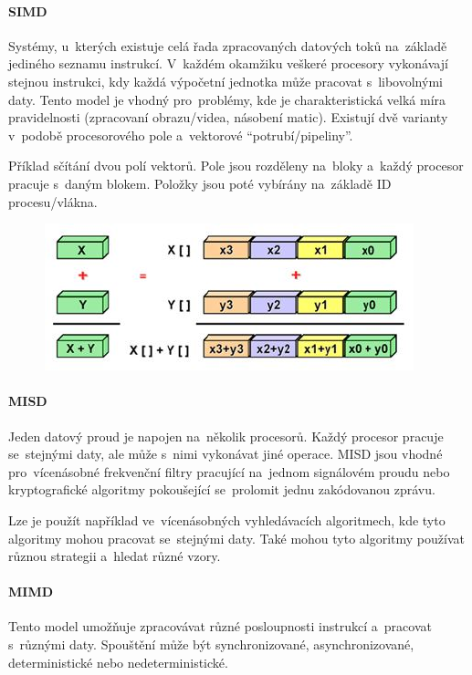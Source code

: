 \paragraph{SIMD}

Systémy, u~kterých existuje celá řada zpracovaných datových toků na~základě jediného seznamu instrukcí. V~každém okamžiku veškeré procesory vykonávají stejnou instrukci, kdy každá výpočetní jednotka může pracovat s~libovolnými daty. Tento model je vhodný pro~problémy, kde je charakteristická velká míra pravidelnosti (zpracovaní obrazu/videa, násobení matic). Existují dvě varianty v~podobě procesorového pole a~vektorové \enquote{potrubí/pipeliny}.

Příklad sčítání dvou polí vektorů. Pole jsou rozděleny na~bloky a~každý procesor pracuje s~daným blokem. Položky jsou poté vybírány na~základě ID procesu/vlákna.

\begin{figure}[ht]
	\centering
	\includegraphics[scale=0.7]{images/SIMD.JPG}
\end{figure}

\paragraph{MISD}

Jeden datový proud je napojen na~několik procesorů. Každý procesor pracuje se~stejnými daty, ale může s~nimi vykonávat jiné operace. MISD jsou vhodné pro~vícenásobné frekvenční filtry pracující na~jednom signálovém proudu nebo kryptografické algoritmy pokoušející se~prolomit jednu zakódovanou zprávu.

Lze je použít například ve~vícenásobných vyhledávacích algoritmech, kde tyto algoritmy mohou pracovat se~stejnými daty. Také mohou tyto algoritmy používat různou strategii a~hledat různé vzory.

\paragraph{MIMD}

Tento model umožňuje zpracovávat různé posloupnosti instrukcí a~pracovat s~různými daty. Spouštění může být synchronizované, asynchronizované, deterministické nebo nedeterministické.

